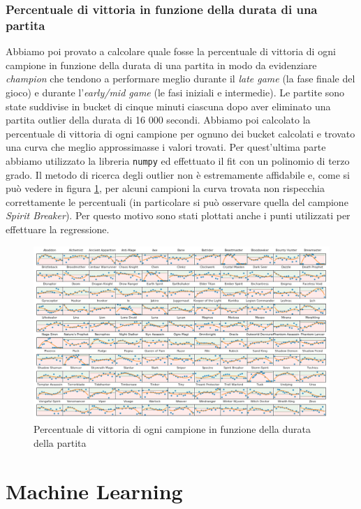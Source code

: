 \documentclass[a4paper,12pt,openany,oneside]{book}
\begin{document}
\subsection{Percentuale di vittoria in funzione della durata di una partita}
Abbiamo poi provato a calcolare quale fosse la percentuale di vittoria di ogni campione in funzione della durata di una partita in modo da evidenziare \textit{champion} che tendono a performare meglio durante il \textit{late game} (la fase finale del gioco) e durante l'\textit{early/mid game} (le fasi iniziali e intermedie). Le partite sono state suddivise in bucket di cinque minuti ciascuna dopo aver eliminato una partita outlier della durata di 16 000 secondi. Abbiamo poi calcolato la percentuale di vittoria di ogni campione per ognuno dei bucket calcolati e trovato una curva che meglio approssimasse i valori trovati. Per quest'ultima parte abbiamo utilizzato la libreria \verb|numpy| ed effettuato il fit con un polinomio di terzo grado. Il metodo di ricerca degli outlier non è estremamente affidabile e, come si può vedere in figura \ref{fig:win_by_length}, per alcuni campioni la curva trovata non rispecchia correttamente le percentuali (in particolare si può osservare quella del campione \textit{Spirit Breaker}). Per questo motivo sono stati plottati anche i punti utilizzati per effettuare la regressione.
\begin{figure}[H]
	\includegraphics[width=\linewidth]{pics/win_by_len.png}
	\caption{Percentuale di vittoria di ogni campione in funzione della durata della partita}
	\label{fig:win_by_length}
\end{figure}




\chapter{Machine Learning}
\end{document}
